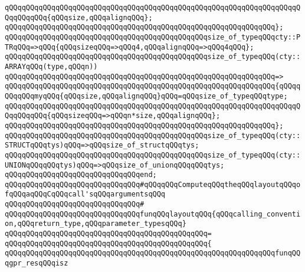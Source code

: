 \newline
\verb|qQQqqQQqqQQqqQQqqQQqqQQqqQQqqQQqqQQqqQQqqQQqqQQqqQQqqQQqqQQqqQQqqQQqqQQqqQQqqQQq{qQQqsize,qQQqalignqQQq};|\newline
\verb|qQQqqQQqqQQqqQQqqQQqqQQqqQQqqQQqqQQqqQQqqQQqqQQqqQQqqQQqqQQqqQQq};|\newline
\newline
\verb|qQQqqQQqqQQqqQQqqQQqqQQqqQQqqQQqqQQqqQQqqQQqqQQqsize_of_typeqQQqcty::PTRqQQq=>qQQq{qQQqsizeqQQq=>qQQq4,qQQqalignqQQq=>qQQq4qQQq};|\newline
\newline
\verb|qQQqqQQqqQQqqQQqqQQqqQQqqQQqqQQqqQQqqQQqqQQqqQQqsize_of_typeqQQq(cty::ARRAYqQQq(type,qQQqn))|\newline
\verb|qQQqqQQqqQQqqQQqqQQqqQQqqQQqqQQqqQQqqQQqqQQqqQQqqQQqqQQqqQQqqQQq=>|\newline
\verb|qQQqqQQqqQQqqQQqqQQqqQQqqQQqqQQqqQQqqQQqqQQqqQQqqQQqqQQqqQQqqQQq{qQQqqQQqqQQqmyqQQq{qQQqsize,qQQqalignqQQq}qQQq=qQQqsize_of_typeqQQqtype;|\newline
\newline
\verb|qQQqqQQqqQQqqQQqqQQqqQQqqQQqqQQqqQQqqQQqqQQqqQQqqQQqqQQqqQQqqQQqqQQqqQQqqQQqqQQq{qQQqsizeqQQq=>qQQqn*size,qQQqalignqQQq};|\newline
\verb|qQQqqQQqqQQqqQQqqQQqqQQqqQQqqQQqqQQqqQQqqQQqqQQqqQQqqQQqqQQqqQQq};|\newline
\newline
\verb|qQQqqQQqqQQqqQQqqQQqqQQqqQQqqQQqqQQqqQQqqQQqqQQqsize_of_typeqQQq(cty::STRUCTqQQqtys)qQQq=>qQQqsize_of_structqQQqtys;|\newline
\verb|qQQqqQQqqQQqqQQqqQQqqQQqqQQqqQQqqQQqqQQqqQQqqQQqsize_of_typeqQQq(cty::UNIONqQQqqQQqtys)qQQq=>qQQqsize_of_unionqQQqqQQqtys;|\newline
\verb|qQQqqQQqqQQqqQQqqQQqqQQqqQQqqQQqend;|\newline
\newline
\verb|qQQqqQQqqQQqqQQqqQQqqQQqqQQqqQQq#qQQqqQQqComputeqQQqtheqQQqlayoutqQQqofqQQqaqQQqCqQQqcall'sqQQqargumentsqQQq|\newline
\verb|qQQqqQQqqQQqqQQqqQQqqQQqqQQqqQQq#|\newline
\verb|qQQqqQQqqQQqqQQqqQQqqQQqqQQqqQQqfunqQQqlayoutqQQq{qQQqcalling_convention,qQQqreturn_type,qQQqparameter_typesqQQq}|\newline
\verb|qQQqqQQqqQQqqQQqqQQqqQQqqQQqqQQqqQQqqQQqqQQqqQQq=|\newline
\verb|qQQqqQQqqQQqqQQqqQQqqQQqqQQqqQQqqQQqqQQqqQQqqQQq{|\newline
\verb|qQQqqQQqqQQqqQQqqQQqqQQqqQQqqQQqqQQqqQQqqQQqqQQqqQQqqQQqqQQqqQQqfunqQQqgpr_resqQQqisz|\newline
